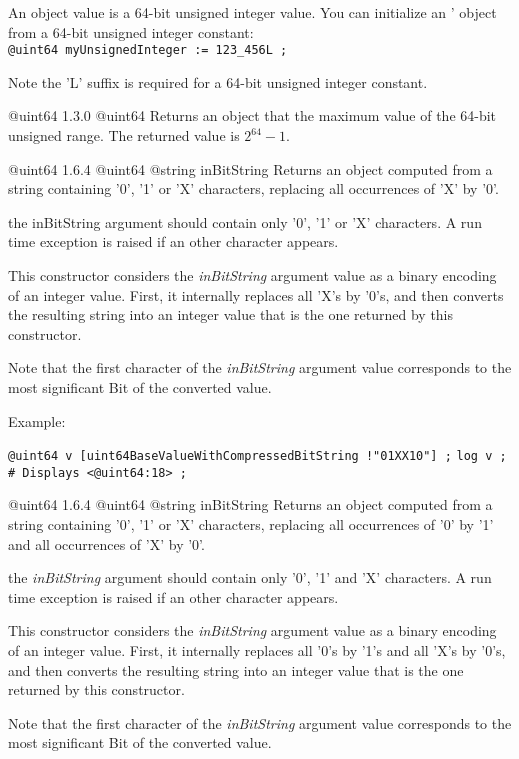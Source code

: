 
An  object value is a 64-bit unsigned integer value. You can initialize an ' object from a 64-bit unsigned integer constant:\\

\texttt{@uint64 myUnsignedInteger := 123\_456L ;}\newline

Note the 'L' suffix is required for a 64-bit unsigned integer constant.



{@uint64}
{1.3.0}
{@uint64}
{Returns an  object that the maximum value of the 64-bit unsigned range.}
{The returned value is $2^{64}-1$.}


{@uint64}
{1.6.4}
{@uint64}
{@string inBitString}
{Returns an  object computed from a string containing '0', '1' or 'X' characters, replacing all occurrences of 'X' by '0'.}
{the inBitString argument should contain only '0', '1' or 'X' characters. A run time exception is raised if an other character appears.

This constructor considers the \emph{inBitString} argument value as a binary encoding of an integer value. First, it internally replaces all 'X's by '0's, and then converts the resulting string into an integer value that is the one returned by this constructor.

Note that the first character of the \emph{inBitString} argument value corresponds to the most significant Bit of the converted value.}


Example:

\texttt{@uint64 v [uint64BaseValueWithCompressedBitString !"01XX10"] ;}\newline
\texttt{log v ; \# Displays <@uint64:18> ;}





{@uint64}
{1.6.4}
{@uint64}
{@string inBitString}
{Returns an  object computed from a string containing '0', '1' or 'X' characters, replacing all occurrences of '0' by '1' and all occurrences of 'X' by '0'.}
{the \emph{inBitString} argument should contain only '0', '1' and 'X' characters. A run time exception is raised if an other character appears.

This constructor considers the \emph{inBitString} argument value as a binary encoding of an integer value. First, it internally replaces all '0's by '1's and all 'X's by '0's, and then converts the resulting string into an integer value that is the one returned by this constructor.

Note that the first character of the \emph{inBitString} argument value corresponds to the most significant Bit of the converted value.}

